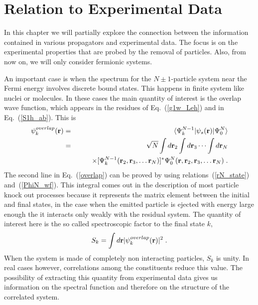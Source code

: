 
\chapter{Relation to Experimental Data}
\label{chap:exp}



In this chapter we will partially explore the connection between the information 
contained in various propagators and experimental data.
The focus is on the experimental properties that are
probed by the removal of particles.
Also, from now on, we will only consider fermionic systems.


An important case is when the spectrum for the $N \pm 1$-particle
system near the Fermi energy involves discrete bound states. This 
happens in finite system like nuclei or molecules.
%
In these cases the main quantity of interest is the overlap wave function, which appears in the
residues of Eq.~(\ref{g1w_Leh}) and in Eq.~(\ref{S1h_ab}). This is
\begin{eqnarray}
\psi^{overlap}_k({\bf r}) &=& \langle \Psi^{N-1}_k \vert \psi_s({\bf r}) \vert \Psi^N_0\rangle
\nonumber \\
 &=& \sqrt{N} \int d{\bf r}_2 \int d{\bf r}_3 \cdots \int d{\bf r}_N
 \label{overlap} \\
&& \qquad  \times [ \Psi^{N-1}_k({\bf r}_2, {\bf r}_3, \ldots {\bf r}_N) ]^*
     \Psi^N_0({\bf r}, {\bf r}_2, {\bf r}_3, \ldots {\bf r}_N) \; .
\nonumber
\end{eqnarray}
The second line in Eq.~(\ref{overlap}) can be proved by using relations~(\ref{rN_state}) and~(\ref{PhiN_wf}).
This integral comes out in the description of most particle knock out processes because it represents the matrix element between the initial and final states, in the case when the emitted particle is ejected with energy large enough the it interacts only weakly with the residual system.
The quantity of interest here is the so called spectroscopic factor to the final state $k$,
\begin{equation}
S_k = \int d{\bf r} \vert \psi^{overlap}_k({\bf r}) \vert^2 \; .
\label{SF}
\end{equation}
When the system is made of completely non interacting particles, $S_k$ is unity. In real cases however, correlations among the constituents reduce this value. The possibility of extracting this quantity from experimental data gives us information on the spectral function and therefore on the structure of the correlated system.




